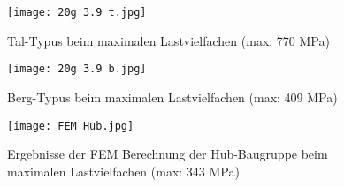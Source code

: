 \begin{figure}[h]
\begin{minipage}[t]{0.5\linewidth}
	\centering
	\texttt{[image: 20g 3.9 t.jpg]}
	\caption{Tal-Typus beim maximalen Lastvielfachen (max: 770 MPa)}
\end{minipage}
\hfill
\begin{minipage}[t]{0.5\linewidth}
	\centering
	\texttt{[image: 20g 3.9 b.jpg]}
	\caption{Berg-Typus beim maximalen Lastvielfachen (max: 409 MPa)}
	\label{abb_AnhangFEM2}
\end{minipage}
\end{figure}
\begin{figure}[h]
\centering
\texttt{[image: FEM Hub.jpg]}
\caption{Ergebnisse der FEM Berechnung der Hub-Baugruppe beim maximalen Lastvielfachen (max: 343 MPa)}
\label{abb_AnhangFEM3}
\end{figure}